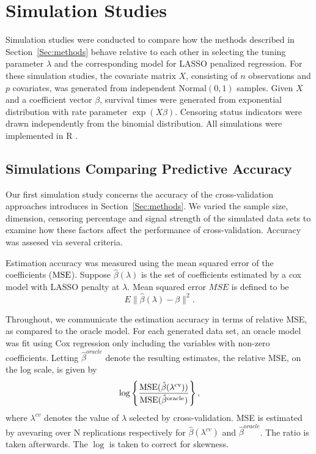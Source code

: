 \section{Simulation Studies}

Simulation studies were conducted to compare how the methods described in Section~\ref{Sec:methods} behave relative to each other in selecting the tuning parameter $\lambda$ and the corresponding model for LASSO penalized regression. For these simulation studies, the covariate matrix $X$, consisting of $n$ observations and $p$ covariates, was generated from independent $\text{Normal}(0, 1)$ samples. Given $X$ and a coefficient vector $\beta$, survival times were generated from exponential distribution with rate parameter $\exp(X\beta)$. Censoring status indicators were drawn independently from the binomial distribution. All simulations were implemented in R \citep{R}. 
   
\subsection {Simulations Comparing Predictive Accuracy}
\label{Sec:accuracy}

Our first simulation study concerns the accuracy of the cross-validation approaches introduces in Section~\ref{Sec:methods}. We varied the sample size, dimension, censoring percentage and signal strength of the simulated data sets to examine how these factors affect the performance of cross-validation. Accuracy was assesed via several criteria.

Estimation accuracy was measured using the mean squared error of the coefficients ($\textrm{MSE}$). Suppose $\hat{\beta}(\lambda)$ is the set of coefficients estimated by a cox model with LASSO penalty at $\lambda$. Mean squared error $MSE$ is defined to be 
\begin{equation}
E\| \hat{\beta}(\lambda) - \beta \| ^2.
\end{equation}

Throughout, we communicate the estimation accuracy in terms of relative MSE, as compared to the oracle model.  For each generated data set, an oracle model was fit using Cox regression only including the variables with non-zero coefficients. Letting $\hat{\beta}^{oracle}$ denote the resulting estimates, the relative MSE, on the log scale, is given by
\begin{equation}
\log\left\{ \frac{\textrm{MSE}(\hat{\beta}(\lambda^{\text{cv}}))}{\textrm{MSE}(\hat{\beta}^{\text{oracle}})} \right\},
\end{equation}
where $\lambda^{cv}$ denotes the value of $\lambda$ selected by cross-validation. MSE is estimated by avevaring over N replications respectively for $\hat{\beta}(\lambda^{cv})$ and $\hat{\beta}^{oracle}$. The ratio is taken afterwards. The $\log$ is taken to correct for skewness. %


